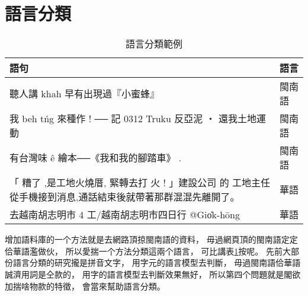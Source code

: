 

\section{語言分類}
\label{節：語言分類}

\begin{table}
\caption{語言分類範例}
\label{表：語言分類範例}
\centering
\begin{tabular}{p{30em}l}
語句 & 語言\\
\hline
聽人講 khah 早有出現過『小蜜蜂』 & 閩南語\\
我 beh tńg 來種作 ! ── 記 0312 Truku 反亞泥 ‧ 還我土地運動 & 閩南語\\
有台灣味 ê 繪本──《我和我的腳踏車》 . & 閩南語\\
「 糟了 ,是工地火燒厝, 緊轉去打 火 ! 」建設公司 的 工地主任從手機接到消息,通話結束後就帶著那群混混先離開了。 & 華語\\
去越南胡志明市 4 工/越南胡志明市四日行 @Gio̍k-hōng & 華語\\
\end{tabular}
\end{table}

增加語料庫的一个方法就是去網路頂掠閩南語的資料，
毋過網頁頂的閩南語定定佮華語濫做伙，
所以愛揣一个方法分類這兩个語言，
可比講表\ref{表：語言分類範例}按呢。
先前大部份語言分類的研究攏是拼音文字，
用字元的語言模型去判斷，
毋過閩南語佮華語誠濟用詞是仝款的，
用字的語言模型去判斷效果無好，
所以第四个問題就是閣欲加揣啥物款的特徵，
會當來幫助語言分類。


